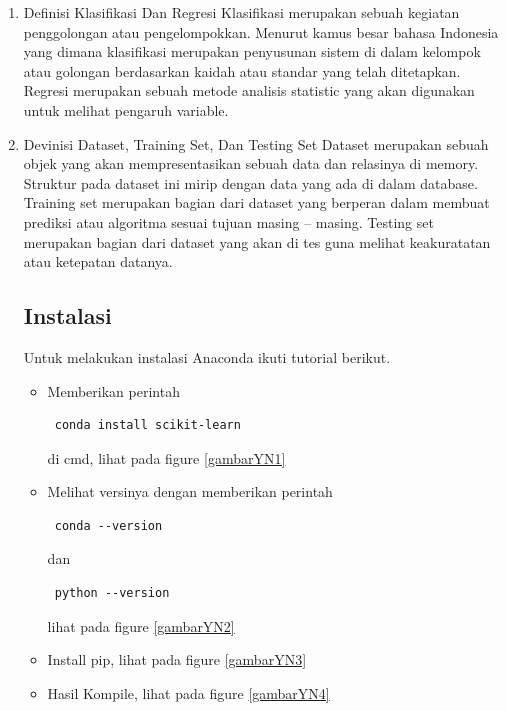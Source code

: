 \begin{enumerate}
\item
Definisi  Klasifikasi Dan Regresi
\subitem
Klasifikasi merupakan sebuah kegiatan penggolongan atau pengelompokkan. Menurut kamus besar bahasa Indonesia yang dimana klasifikasi merupakan penyusunan sistem di dalam kelompok atau golongan berdasarkan kaidah atau standar yang telah ditetapkan. Regresi merupakan sebuah metode analisis statistic yang akan digunakan untuk melihat pengaruh variable.

\item
Devinisi Dataset, Training Set, Dan Testing Set
\subitem
Dataset merupakan sebuah objek yang akan mempresentasikan sebuah data dan relasinya di memory. Struktur pada dataset ini mirip dengan data yang ada di dalam database. Training set merupakan bagian dari dataset yang berperan dalam membuat prediksi atau algoritma sesuai tujuan masing – masing. Testing set merupakan bagian dari dataset yang akan di tes guna melihat keakuratatan atau ketepatan datanya.

\subsection{Instalasi}
\subitem
Untuk melakukan instalasi Anaconda ikuti tutorial berikut.
\begin{itemize}
\item
Memberikan perintah \begin{verbatim} conda install scikit-learn \end{verbatim} di cmd, lihat pada figure \ref{gambarYN1}
\item
Melihat versinya dengan memberikan perintah \begin{verbatim} conda --version \end{verbatim} dan \begin{verbatim} python --version \end{verbatim} lihat pada figure \ref{gambarYN2}
\item
Install pip, lihat pada figure \ref{gambarYN3}
\item
Hasil Kompile, lihat pada figure \ref{gambarYN4}
\end{itemize}


\end{enumerate}
